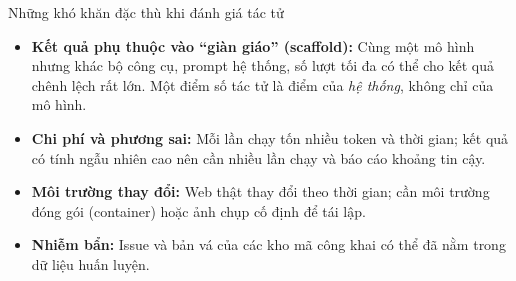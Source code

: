\begin{center}
\label{fig:swebench}
\end{center}

\begin{assess}{Những khó khăn đặc thù khi đánh giá tác tử}
\begin{itemize}
	\item \textbf{Kết quả phụ thuộc vào “giàn giáo” (scaffold):} Cùng một mô hình nhưng khác bộ công cụ, prompt hệ thống, số lượt tối đa có thể cho kết quả chênh lệch rất lớn. Một điểm số tác tử là điểm của \emph{hệ thống}, không chỉ của mô hình.
	\item \textbf{Chi phí và phương sai:} Mỗi lần chạy tốn nhiều token và thời gian; kết quả có tính ngẫu nhiên cao nên cần nhiều lần chạy và báo cáo khoảng tin cậy.
	\item \textbf{Môi trường thay đổi:} Web thật thay đổi theo thời gian; cần môi trường đóng gói (container) hoặc ảnh chụp cố định để tái lập.
	\item \textbf{Nhiễm bẩn:} Issue và bản vá của các kho mã công khai có thể đã nằm trong dữ liệu huấn luyện.
\end{itemize}
\end{assess}


